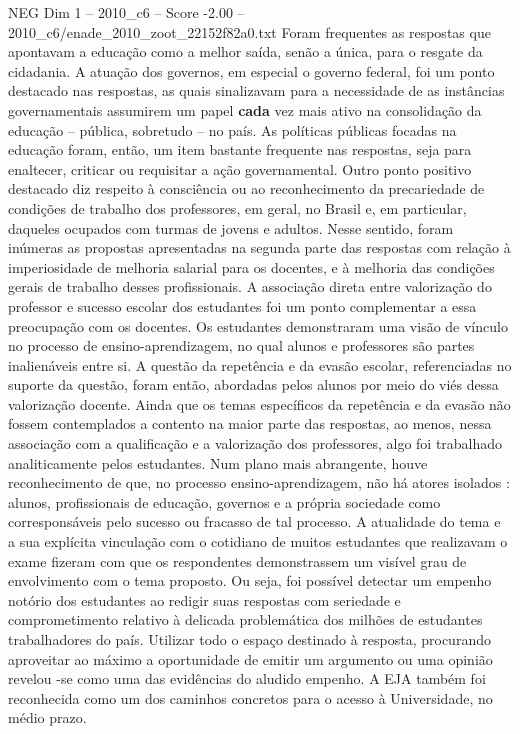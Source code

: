 \begin{textsample}{NEG Dim 1 – 2010\_c6 – Score -2.00 – 2010\_c6/enade\_2010\_zoot\_22152f82a0.txt}
Foram frequentes as respostas que apontavam a educação como a melhor saída, senão a única, para o resgate da cidadania.
A atuação dos governos, em especial o governo federal, foi um ponto destacado nas respostas, as quais sinalizavam para a necessidade de as instâncias governamentais assumirem um papel \textbf{cada} vez mais ativo na consolidação da educação – pública, sobretudo – no país.
As políticas públicas focadas na educação foram, então, um item bastante frequente nas respostas, seja para enaltecer, criticar ou requisitar a ação governamental.
Outro ponto positivo destacado diz respeito à consciência ou ao reconhecimento da precariedade de condições de trabalho dos professores, em geral, no Brasil e, em particular, daqueles ocupados com turmas de jovens e adultos.
Nesse sentido, foram inúmeras as propostas apresentadas na segunda parte das respostas com relação à imperiosidade de melhoria salarial para os docentes, e à melhoria das condições gerais de trabalho desses profissionais.
A associação direta entre valorização do professor e sucesso escolar dos estudantes foi um ponto complementar a essa preocupação com os docentes.
Os estudantes demonstraram uma visão de vínculo no processo de ensino-aprendizagem, no qual alunos e professores são partes inalienáveis entre si.
A questão da repetência e da evasão escolar, referenciadas no suporte da questão, foram então, abordadas pelos alunos por meio do viés dessa valorização docente.
Ainda que os temas específicos da repetência e da evasão não fossem contemplados a contento na maior parte das respostas, ao menos, nessa associação com a qualificação e a valorização dos professores, algo foi trabalhado analiticamente pelos estudantes.
Num plano mais abrangente, houve reconhecimento de que, no processo ensino-aprendizagem, não há atores isolados : alunos, profissionais de educação, governos e a própria sociedade como corresponsáveis pelo sucesso ou fracasso de tal processo.
A atualidade do tema e a sua explícita vinculação com o cotidiano de muitos estudantes que realizavam o exame fizeram com que os respondentes demonstrassem um visível grau de envolvimento com o tema proposto.
Ou seja, foi possível detectar um empenho notório dos estudantes ao redigir suas respostas com seriedade e comprometimento relativo à delicada problemática dos milhões de estudantes trabalhadores do país.
Utilizar todo o espaço destinado à resposta, procurando aproveitar ao máximo a oportunidade de emitir um argumento ou uma opinião revelou -se como uma das evidências do aludido empenho.
A EJA também foi reconhecida como um dos caminhos concretos para o acesso à Universidade, no médio prazo.

\end{textsample}
